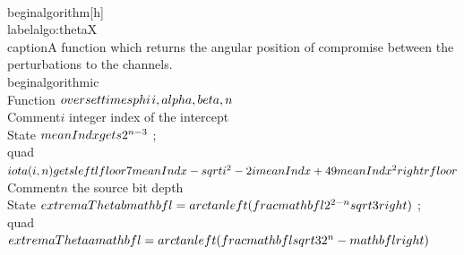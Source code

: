  \\begin{algorithm}[h]\\label{algo:thetaX}
  \\caption{A function which returns the angular position of compromise between the perturbations to the channels.}
 \\begin{algorithmic}
      \\Function { $\\overset{\\times}{\\phi}$}{$ i, \\alpha, \\beta, n $} \\Comment{$i$ integer index of the intercept }
       \\State $\\meanIndx \\gets  2^{n-3}$  ; \\quad  $\\iota(i,n)  \\gets  \\left\\lfloor 7\\ \\meanIndx-\\sqrt{i^2 - 2 i \\meanIndx + 49\\ \\meanIndx^2 }\\right\\rfloor $  \\Comment{$n$ the source bit depth}
        \\State $\\extremaTheta{b}{\\mathbf{l} } = \\arctan\\left(\\frac{\\mathbf{l} 2^{2-n}}{\\sqrt{3}}       \\right)$ ; \\quad 
        $\\extremaTheta{a}{\\mathbf{l} } = \\arctan\\left(\\frac{\\mathbf{l} \\sqrt{3} }{2^n - \\mathbf{l}}\\right)$
